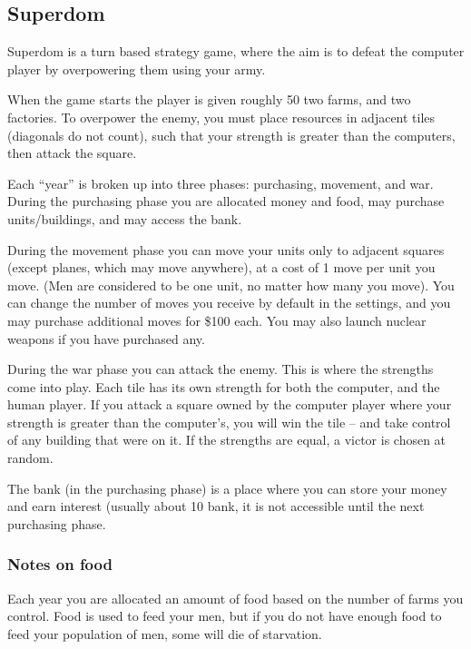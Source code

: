 \subsection{Superdom}

Superdom is a turn based strategy game, where the aim is to defeat the computer
player by overpowering them using your army.

When the game starts the player is given roughly 50%
two farms, and two factories. To overpower the enemy, you must place resources
in adjacent tiles (diagonals do not count), such that your strength is greater
than the computers, then attack the square.

Each ``year'' is broken up into three phases: purchasing, movement, and war.
During the purchasing phase you are allocated money and food, may purchase
units/buildings, and may access the bank.

During the movement phase you can move your units only to adjacent squares
(except planes, which may move anywhere), at a cost of 1 move per unit you move.
(Men are considered to be one unit, no matter how many you move). You can change
the number of moves you receive by default in the settings, and you may purchase
additional moves for \$100 each. You may also launch nuclear weapons if you have
purchased any.

During the war phase you can attack the enemy. This is where the strengths come
into play. Each tile has its own strength for both the computer, and the human
player. If you attack a square owned by the computer player where your strength
is greater than the computer's, you will win the tile -- and take control of any
building that were on it. If the strengths are equal, a victor is chosen at
random.

The bank (in the purchasing phase) is a place where you can store your money
and earn interest (usually about 10%
bank, it is not accessible until the next purchasing phase.

\subsubsection{Notes on food}
Each year you are allocated an amount of food based on the number of farms you
control. Food is used to feed your men, but if you do not have enough food to
feed your population of men, some will die of starvation.

